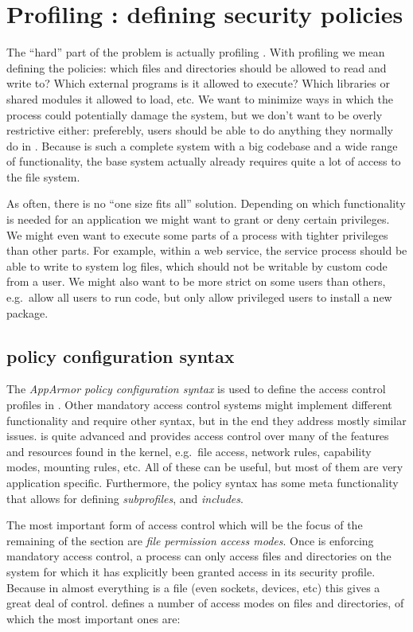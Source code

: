 \section{Profiling \R: defining security policies}

The ``hard'' part of the problem is actually profiling \R. With
profiling we mean defining the policies: which files and directories should
\R be allowed to read and write to? Which external programs is it
allowed to execute? Which libraries or shared modules it allowed to load, etc.
We want to minimize ways in which the process could potentially damage the
system, but we don't want to be overly restrictive either: preferebly, users
should be able to do anything they normally do in \R. Because \R is
such a complete system with a big codebase and a wide range of functionality,
the base system actually already requires quite a lot of access to the file
system.

As often, there is no ``one size fits all'' solution. Depending on which
functionality is needed for an application we might want to grant or deny
certain privileges. We might even want to execute some parts of a process with
tighter privileges than other parts. For example, within a web service, the
service process should be able to write to system log files, which should not be
writable by custom code from a user. We might also want to be more strict on
some users than others, e.g.\ allow all users to run code, but only allow
privileged users to install a new package.

\subsection{\AppArmor policy configuration syntax}
\label{syntax}

The \emph{AppArmor policy configuration syntax} is used to define the access
control profiles in \AppArmor. Other mandatory access control systems
might implement different functionality and require other syntax, but in the end
they address mostly similar issues. \AppArmor is quite advanced and provides
access control over many of the features and resources found in the \Linux
kernel, e.g.\ file access, network rules, \Linux capability modes, mounting
rules, etc. All of these can be useful, but most of them are very application
specific. Furthermore, the policy syntax has some meta functionality that
allows for defining \emph{subprofiles}, and \emph{includes}.

The most important form of access control which will be the focus of the
remaining of the section are \emph{file permission access modes}. Once \AppArmor
is enforcing mandatory access control, a process can only access files and
directories on the system for which it has explicitly been granted access in
its security profile. Because in \Linux almost everything is a file
(even sockets, devices, etc) this gives a great deal of control. \AppArmor
defines a number of access modes on files and directories, of which the most
important ones are:

